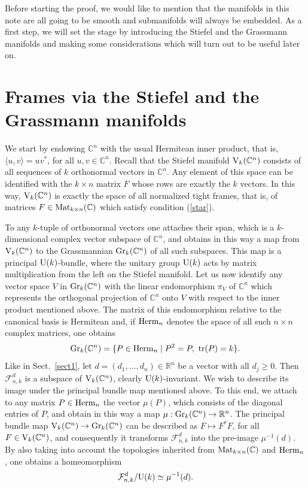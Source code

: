 \documentclass[12pt]{amsart}
\theoremstyle{definition}
\theoremstyle{remark}
\newcommand{\RR}{\mathbb R}
\newcommand{\CC}{\mathbb C}
\begin{document}
Before starting the proof, we would like to mention that the manifolds in this note are all going to be smooth  and  submanifolds will always be embedded. 
As a first step, we will set the stage by introducing the  Stiefel and the Grassmann manifolds and making some considerations which will turn out to be  useful later on.

\section{Frames via the Stiefel and the Grassmann manifolds}\label{Grass}

We start by endowing $\CC^n$ with the usual Hermitean inner product, that is, $\langle u, v\rangle =uv^*$, for all $u,v \in \CC^n$.  Recall that the Stiefel manifold 
${\rm V}_k(\CC^n)$ consists of all sequences of $k$ orthonormal vectors in
$\CC^n$. 
Any element of this space can be identified with the $k\times n$ matrix $F$ whose rows are exactly the $k$ vectors. 
In this way, ${\rm V}_k(\CC^n)$ is exactly the space of all normalized tight frames, that is, of matrices $F\in {\rm Mat}_{k\times n}(\CC)$
which satisfy condition (\ref{star}). 

To any $k$-tuple of orthonormal vectors one attaches their span, which is a $k$-dimensional complex vector subspace of $\CC^n$,
and obtains in this way a map from ${\rm V}_k(\CC^n)$ to the Grassmannian   ${\rm Gr}_k(\CC^n)$ of all such subspaces. 
This map is a principal ${\rm U}(k)$-bundle, where the unitary group ${\rm U}(k)$ acts by matrix multiplication from the left on the Stiefel manifold.
Let us now identify any vector space $V$ in ${\rm Gr}_k(\CC^n)$ with the linear endomorphism $\pi_V$ of $\CC^n$ which represents the orthogonal projection of $\CC^n$  onto $V$ with respect to the inner product
mentioned above. The matrix of this endomorphism relative to the canonical basis is Hermitean and, if  
${\rm Herm}_n$ denotes the space of all such $n\times n$ complex matrices, one obtains 
\begin{equation}\label{gra}{\rm Gr}_k(\CC^n) = \{P \in {\rm Herm}_n \mid P^2=P, \ {\rm tr}(P)=k\}.\end{equation}
Like in Sect.~\ref{sect1}, let  $d=(d_1,\ldots, d_n) \in \RR^n$ be a vector with all $d_j \ge 0$. Then ${\mathcal F}_{n,k}^d$ is a subspace of
${\rm V}_k(\CC^n)$, clearly ${\rm U}(k)$-invariant. We wish to describe its image under the principal bundle map
mentioned above. To this end, we attach to any matrix $P \in {\rm Herm}_n$ the vector $\mu(P)$, which consists of the diagonal entries of $P$, and obtain in this way  a map $\mu : {\rm Gr}_k(\CC^n) \to \RR^n$. 
The principal bundle map ${\rm V}_k(\CC^n)\to {\rm Gr}_k(\CC^n)$ can be described as $F\mapsto F^* F$, for all $F\in {\rm V}_k(\CC^n)$, 
and consequently it transforms ${\mathcal F}_{n,k}^d$ into the pre-image  $\mu^{-1}(d)$. 
By also taking into account the topologies inherited from ${\rm Mat}_{k\times n}(\CC)$ and ${\rm Herm}_n$, one obtains a
homeomorphism
\begin{equation}\label{hom}{\mathcal F}_{n,k}^d /{\rm U}(k) \simeq \mu^{-1}(d).\end{equation}
\end{document}
